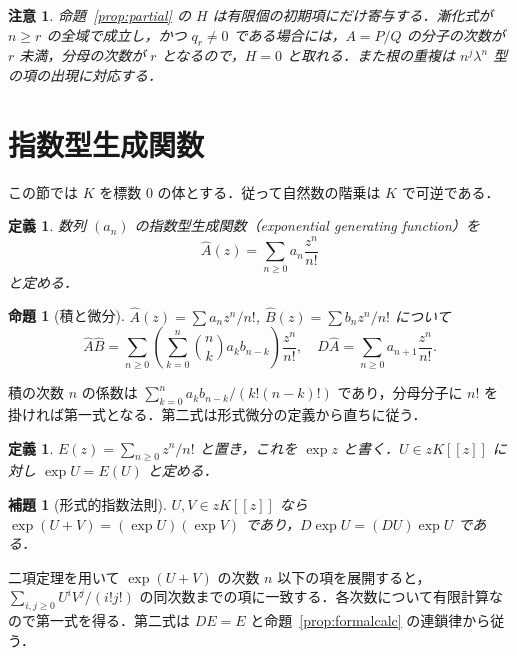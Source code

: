 \documentclass[a5paper,10pt,onecolumn]{jsarticle}
\makeatletter
\theoremstyle{mathnotetheorem}
\newtheorem{definition}[theorem]{定義}
\newtheorem{lemma}[theorem]{補題}
\newtheorem{proposition}[theorem]{命題}
\newtheorem{remark}[theorem]{注意}
\renewcommand{\proofname}{証明}
\renewenvironment{proof}[1][\proofname]{%
  \par\pushQED{\qed}\normalfont\topsep4\p@\@plus2\p@\relax
  \trivlist\item[\hskip\labelsep\bfseries #1]\ignorespaces
}{\popQED\endtrivlist\@endpefalse}
\makeatother
\begin{document}
\begin{remark}
命題~\ref{prop:partial} の $H$ は有限個の初期項にだけ寄与する．漸化式が $n\ge r$ の全域で成立し，かつ $q_r\ne0$ である場合には，$A=P/Q$ の分子の次数が $r$ 未満，分母の次数が $r$ となるので，$H=0$ と取れる．また根の重複は $n^j\lambda^n$ 型の項の出現に対応する．
\end{remark}

\section{指数型生成関数}
この節では $K$ を標数 $0$ の体とする．従って自然数の階乗は $K$ で可逆である．
\begin{definition}
数列 $(a_n)$ の\emph{指数型生成関数}（exponential generating function）を
\[
 \widehat A(z)=\sum_{n\ge0}a_n\frac{z^n}{n!}
\]
と定める．
\end{definition}
\begin{proposition}[積と微分]\label{prop:egf}
$\widehat A(z)=\sum a_nz^n/n!$, $\widehat B(z)=\sum b_nz^n/n!$ について
\[
 \widehat A\widehat B=
 \sum_{n\ge0}\left(\sum_{k=0}^{n}\binom nk a_kb_{n-k}\right)\frac{z^n}{n!},
 \quad D\widehat A=\sum_{n\ge0}a_{n+1}\frac{z^n}{n!}.
\]
\end{proposition}
\begin{proof}
積の次数 $n$ の係数は $\sum_{k=0}^n a_kb_{n-k}/(k!(n-k)!)$ であり，分母分子に $n!$ を掛ければ第一式となる．第二式は形式微分の定義から直ちに従う．
\end{proof}

\begin{definition}
$E(z)=\sum_{n\ge0}z^n/n!$ と置き，これを $\exp z$ と書く．$U\in zK[[z]]$ に対し $\exp U=E(U)$ と定める．
\end{definition}
\begin{lemma}[形式的指数法則]
$U,V\in zK[[z]]$ なら
$\exp(U+V)=(\exp U)(\exp V)$ であり，$D\exp U=(DU)\exp U$ である．
\end{lemma}
\begin{proof}
二項定理を用いて $\exp(U+V)$ の次数 $n$ 以下の項を展開すると，$\sum_{i,j\ge0}U^iV^j/(i!j!)$ の同次数までの項に一致する．各次数について有限計算なので第一式を得る．第二式は $DE=E$ と命題~\ref{prop:formalcalc} の連鎖律から従う．
\end{proof}
\end{document}
